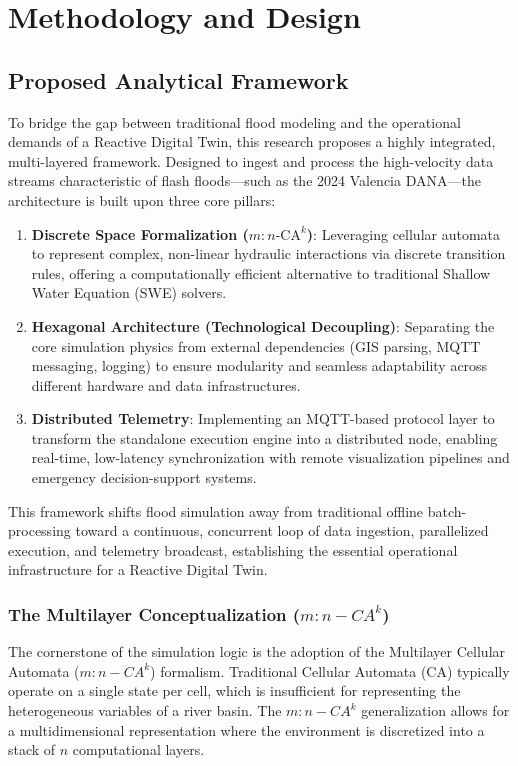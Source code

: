 \chapter{Methodology and Design}
\label{chapter:methodology_and_design}

\section{Proposed Analytical Framework}

To bridge the gap between traditional flood modeling and the operational demands of a Reactive Digital Twin, this research proposes a highly integrated, multi-layered framework. Designed to ingest and process the high-velocity data streams characteristic of flash floods—such as the 2024 Valencia DANA—the architecture is built upon three core pillars:

\begin{enumerate}
    \item \textbf{Discrete Space Formalization ($m:n\text{-CA}^k$)}: Leveraging cellular automata to represent complex, non-linear hydraulic interactions via discrete transition rules, offering a computationally efficient alternative to traditional Shallow Water Equation (SWE) solvers.
    \item \textbf{Hexagonal Architecture (Technological Decoupling)}: Separating the core simulation physics from external dependencies (GIS parsing, MQTT messaging, logging) to ensure modularity and seamless adaptability across different hardware and data infrastructures.
    \item \textbf{Distributed Telemetry}: Implementing an MQTT-based protocol layer to transform the standalone execution engine into a distributed node, enabling real-time, low-latency synchronization with remote visualization pipelines and emergency decision-support systems.
\end{enumerate}

This framework shifts flood simulation away from traditional offline batch-processing toward a continuous, concurrent loop of data ingestion, parallelized execution, and telemetry broadcast, establishing the essential operational infrastructure for a Reactive Digital Twin.


\subsection{The Multilayer Conceptualization ($m:n-CA^k$)}

The cornerstone of the simulation logic is the adoption of the Multilayer Cellular Automata ($m:n-CA^k$) formalism. Traditional 
Cellular Automata (CA) typically operate on a single state per cell, which is insufficient for representing the heterogeneous variables 
of a river basin. The $m:n-CA^k$ generalization allows for a multidimensional representation where the environment is discretized into 
a stack of $n$ computational layers.

